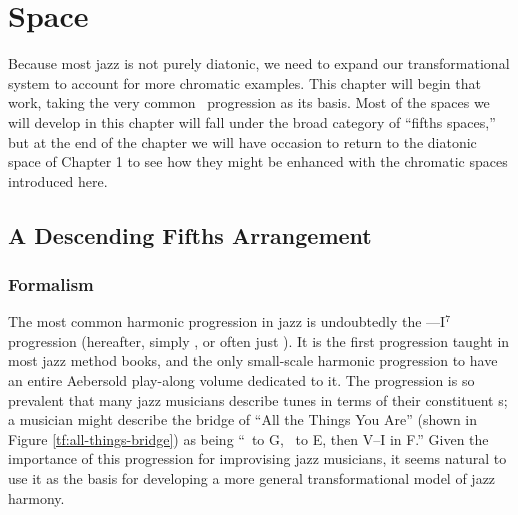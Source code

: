 
\chapter{\tf Space}
\label{chap:tf-space}
\addtocspace


%
%
Because most jazz is not purely diatonic, we need to expand our
transformational system to account for more chromatic examples. This chapter
will begin that work, taking the very common \tfo\ progression as its basis.
Most of the spaces we will develop in this chapter will fall under the broad
category of “fifths spaces,” but at the end of the chapter we will have
occasion to return to the diatonic space of Chapter 1 to see how they might be
enhanced with the chromatic spaces introduced here.

\section{A Descending Fifths Arrangement}
\label{sec:tf-space-1}

\subsection{Formalism}

The most common harmonic progression in jazz is undoubtedly the
\mbox{\ii--\V--I$^7$} progression (hereafter, simply \tfo, or
often just \tf). It is the first progression taught in most jazz method books,
and the only small-scale harmonic progression to have an entire Aebersold
play-along volume dedicated to it. The progression is so prevalent
that many jazz musicians describe tunes in terms of their constituent \tf{}s;
a musician might describe the bridge of “All the Things You Are” (shown in
Figure \ref{tf:all-things-bridge}) as being “\tf\ to G, \tf\ to E, then V--I
in F.” Given the importance of this progression for improvising jazz
musicians, it seems natural to use it as the basis for developing
a more general transformational model of jazz harmony.

